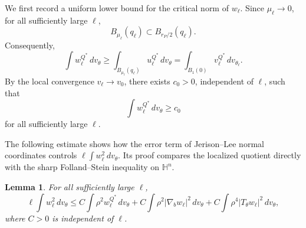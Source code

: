 \documentclass[11pt]{article}
\numberwithin{equation}{section}
\newtheorem{lemma}{Lemma}[section]
\numberwithin{equation}{section}
\begin{document}
We first record a uniform lower bound for the critical norm of \(w_\ell\).
Since \(\mu_\ell\to0\), for all sufficiently large \(\ell\),
\[
B_{\mu_\ell}(q_\ell)\subset B_{r_P/2}(q_\ell).
\]
Consequently,
\[
\int w_\ell^{Q^*}\,dv_\theta
\ge
\int_{B_{\mu_\ell}(q_\ell)}
u_\ell^{Q^*}\,dv_\theta  
=
\int_{B_1(0)}
v_\ell^{Q^*}\,dv_{\theta_\ell}.
\]
By the local convergence \(v_\ell\to v_0\), there exists \(c_0>0\),
independent of \(\ell\), such that
\begin{equation}\label{eq:cutoff-mass-lower}
\int w_\ell^{Q^*}\,dv_\theta\ge c_0
\end{equation}
for all sufficiently large \(\ell\).

The following estimate shows how the error term of Jerison--Lee normal coordinates controls \(\ell \int w_\ell^2\,dv_\theta\).  Its proof compares the localized quotient directly
with the sharp Folland--Stein inequality on \(\mathbb H^n\).

\begin{lemma}\label{lemmapohozaev}
For all sufficiently large \(\ell\),
\[
\ell\int w_\ell^2\,dv_\theta
\le
C\int \rho^2w_\ell^{Q^*}\,dv_\theta
+
C\int \rho^2|\nabla_bw_\ell|^2\,dv_\theta 
+
C\int \rho^4|T_\theta w_\ell|^2\,dv_\theta,
\]
where \(C>0\) is independent of \(\ell\).
\end{lemma}
\end{document}
